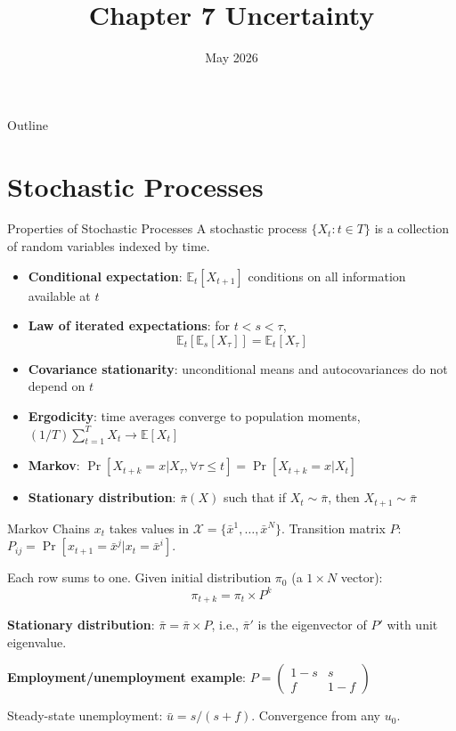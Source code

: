 \documentclass[blue]{beamer}
\title[Chapter7]{Chapter 7 Uncertainty}
\author[]{}
\date[May 2026]{May 2026}
\newcommand{\E}{\mathbb{E}}
\begin{document}
  \frame
  {
    \titlepage
  }


\begin{frame}{Outline}
	\tableofcontents
\end{frame}

\section{Stochastic Processes}

\begin{frame}{Properties of Stochastic Processes}
	A stochastic process $\{X_t : t \in T\}$ is a collection of random variables indexed by time.
	
	\begin{itemize}
		\item \textbf{Conditional expectation}: $\E_t[X_{t+1}]$ conditions on all information available at $t$
		\item \textbf{Law of iterated expectations}: for $t < s < \tau$, 
		$$
		\E_t[\E_s[X_\tau]] = \E_t[X_\tau]
		$$
		\item \textbf{Covariance stationarity}: unconditional means and autocovariances do not depend on $t$
		\item \textbf{Ergodicity}: time averages converge to population moments, $(1/T)\sum_{t=1}^{T} X_t \to \E[X_t]$
		\item \textbf{Markov}: $\Pr[X_{t+k} = x | X_\tau, \forall \tau \leq t] = \Pr[X_{t+k} = x | X_t]$
		\item \textbf{Stationary distribution}: $\bar{\pi}(X)$ such that if $X_t \sim \bar{\pi}$, then $X_{t+1} \sim \bar{\pi}$
	\end{itemize}
\end{frame}

\begin{frame}{Markov Chains}
	$x_t$ takes values in $\mathcal{X} = \{\bar{x}^1, \ldots, \bar{x}^N\}$. Transition matrix $P$: $P_{ij} = \Pr[x_{t+1} = \bar{x}^j | x_t = \bar{x}^i]$.
	
	\bigskip
	Each row sums to one. Given initial distribution $\pi_0$ (a $1 \times N$ vector):
	\[
	\pi_{t+k} = \pi_t \times P^k
	\]
	
	\textbf{Stationary distribution}: $\bar{\pi} = \bar{\pi} \times P$, i.e., $\bar{\pi}'$ is the eigenvector of $P'$ with unit eigenvalue.
	
	\bigskip
	\textbf{Employment/unemployment example}: $P = \begin{pmatrix} 1-s & s \\ f & 1-f \end{pmatrix}$
	
	Steady-state unemployment: $\bar{u} = s/(s+f)$. Convergence from any $u_0$.
\end{frame}
\end{document}
